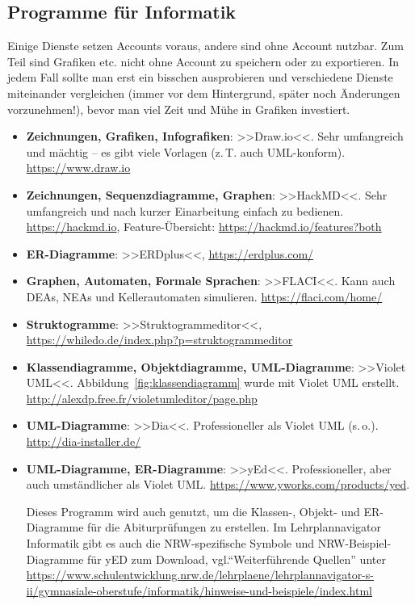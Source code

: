 \documentclass[11pt, a4paper, oneside, openright]{article}
\newcommand \vgl{vgl.\xspace }
\newcommand \etc{etc.\xspace }
\newcommand \zT{z.\,T.\xspace }
\newcommand \so{s.\,o.\xspace }
\begin{document}
\subsection{Programme für Informatik}
\label{sec:programmeInformatik}
Einige Dienste setzen Accounts voraus, andere sind ohne Account nutzbar. Zum Teil sind Grafiken \etc nicht ohne Account zu speichern oder zu exportieren. In jedem Fall sollte man erst ein bisschen ausprobieren und verschiedene Dienste miteinander vergleichen (immer vor dem Hintergrund, später noch Änderungen vorzunehmen!), bevor man viel Zeit und Mühe in Grafiken investiert.

\begin{itemize}
    \item \textbf{Zeichnungen, Grafiken, Infografiken}: >>Draw.io<<. Sehr umfangreich und mächtig -- es gibt viele Vorlagen (\zT auch UML-konform). \url{https://www.draw.io}
    
    \item \textbf{Zeichnungen, Sequenzdiagramme, Graphen}: >>HackMD<<. Sehr umfangreich und nach kurzer Einarbeitung einfach zu bedienen. \url{https://hackmd.io}, Feature-Übersicht: \url{https://hackmd.io/features?both}
    
    \item \textbf{ER-Diagramme}: >>ERDplus<<, \url{https://erdplus.com/}
    
    \item \textbf{Graphen, Automaten, Formale Sprachen}: >>FLACI<<. Kann auch DEAs, NEAs und Kellerautomaten simulieren. \url{https://flaci.com/home/}
    
    \item \textbf{Struktogramme}: >>Struktogrammeditor<<, \url{https://whiledo.de/index.php?p=struktogrammeditor}
    
    \item \textbf{Klassendiagramme, Objektdiagramme, UML-Diagramme}: >>Violet UML<<. Abbildung~\ref{fig:klassendiagramm} wurde mit Violet UML erstellt. \url{http://alexdp.free.fr/violetumleditor/page.php}
    
    \item \textbf{UML-Diagramme}: >>Dia<<. Professioneller als Violet UML (\so). \url{http://dia-installer.de/} 
    
    \item \textbf{UML-Diagramme, ER-Diagramme}: >>yEd<<. Professioneller, aber auch umständlicher als Violet UML. \url{https://www.yworks.com/products/yed}. 
    
    Dieses Programm wird auch genutzt, um die Klassen-, Objekt- und ER-Diagramme für die Abiturprüfungen zu erstellen. Im Lehrplannavigator Informatik gibt es auch die NRW-spezifische Symbole und NRW-Beispiel-Diagramme für yED zum Download, \vgl \enquote{Weiterführende Quellen} unter \url{https://www.schulentwicklung.nrw.de/lehrplaene/lehrplannavigator-s-ii/gymnasiale-oberstufe/informatik/hinweise-und-beispiele/index.html} 
    

\end{itemize}
\end{document}
